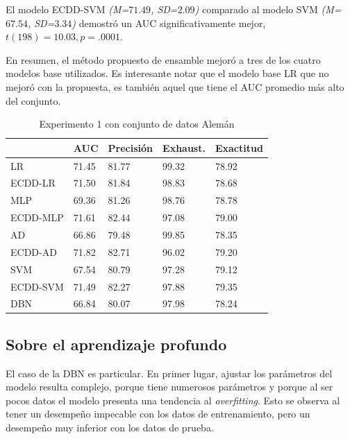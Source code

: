 El modelo ECDD-SVM \textit{(M=$71.49$, SD=$2.09$)} comparado al modelo \ac{SVM} \textit{(M=$67.54$, SD=$3.34$)} demostró un \ac{AUC} significativamente mejor, $t(198)=10.03, p=.0001$.

En resumen, el método propuesto de ensamble mejoró a tres de los cuatro modelos base utilizados. Es interesante notar que el modelo base \ac{LR} que no mejoró con la propuesta, es también aquel que tiene el \ac{AUC} promedio más alto del conjunto.


\begin{table}[htbp]
\centering
\caption{Experimento 1 con conjunto de datos Alemán}
\label{tab:german-proc1}
\begin{tabularx}{0.75\textwidth}{|l|Y Y Y Y|}
				\hline
				& AUC		& Precisión	& Exhaust.		& Exactitud	\\
				\hline
LR				& 71.45		& 81.77		& 99.32			& 78.92		\\		%
ECDD-LR			& 71.50		& 81.84		& 98.83			& 78.68		\\		%
				\hline
MLP				& 69.36		& 81.26		& 98.76			& 78.78		\\		%
ECDD-MLP		& 71.61		& 82.44		& 97.08			& 79.00		\\		%
				\hline
AD				& 66.86		& 79.48		& 99.85			& 78.35		\\		%
ECDD-AD			& 71.82		& 82.71		& 96.02			& 79.20		\\		%
				\hline
SVM				& 67.54		& 80.79		& 97.28			& 79.12		\\		%
ECDD-SVM		& 71.49		& 82.27		& 97.88			& 79.35		\\		%
				\hline
DBN				& 66.84		& 80.07		& 97.98			& 78.24		\\		%
				\hline
\end{tabularx}
\end{table}

\subsection{Sobre el aprendizaje profundo}

El caso de la \ac{DBN} es particular. En primer lugar, ajustar los parámetros del modelo resulta complejo, porque tiene numerosos parámetros y porque al ser pocos datos el modelo presenta una tendencia al \textit{overfitting}. Esto se observa al tener un desempeño impecable con los datos de entrenamiento, pero un desempeño muy inferior con los datos de prueba.

